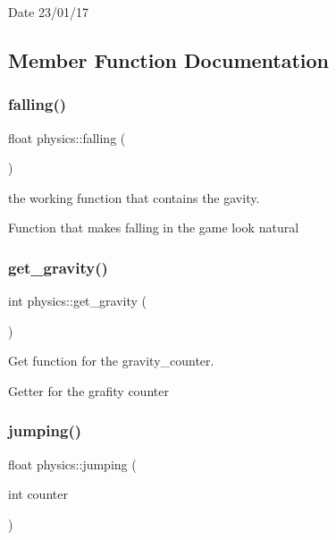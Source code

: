 \begin{DoxyDate}{Date}
23/01/17 
\end{DoxyDate}


\subsection{Member Function Documentation}
\mbox{\label{classphysics_acca1ee2fb8b760b6e4ee61ae7c2ee3da}} 
\subsubsection{\texorpdfstring{falling()}{falling()}}
{\footnotesize\ttfamily float physics\+::falling (\begin{DoxyParamCaption}{ }\end{DoxyParamCaption})}



the working function that contains the gavity. 

Function that makes falling in the game look natural \mbox{\label{classphysics_a3c4c6084fe0652b0bfd35afa5daa1c1e}} 
\subsubsection{\texorpdfstring{get\+\_\+gravity()}{get\_gravity()}}
{\footnotesize\ttfamily int physics\+::get\+\_\+gravity (\begin{DoxyParamCaption}{ }\end{DoxyParamCaption})}



Get function for the gravity\+\_\+counter. 

Getter for the grafity counter \mbox{\label{classphysics_aaf1c57aa6e35b9c83ccbfdfa8c18468c}} 
\subsubsection{\texorpdfstring{jumping()}{jumping()}}
{\footnotesize\ttfamily float physics\+::jumping (\begin{DoxyParamCaption}\item[{int}]{counter }\end{DoxyParamCaption})}




